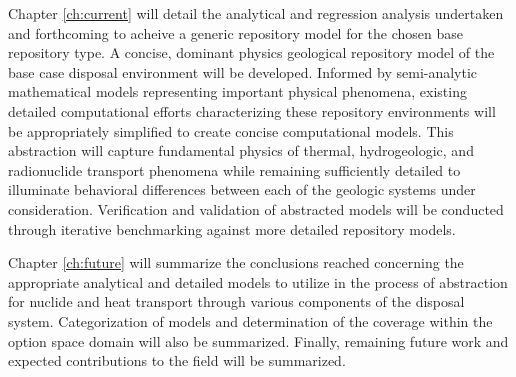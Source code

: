 Chapter \ref{ch:current} will detail the analytical and regression 
analysis undertaken and forthcoming to acheive a generic repository model for the 
chosen base repository type. A concise, dominant physics geological 
repository model of the base case disposal environment will be 
developed. Informed by semi-analytic mathematical models representing 
important physical phenomena, existing detailed computational efforts 
characterizing these repository environments will be appropriately 
simplified to create concise computational models. This abstraction 
will capture fundamental physics of thermal, hydrogeologic, and 
radionuclide transport phenomena while remaining sufficiently detailed 
to illuminate behavioral differences between each of the geologic 
systems under consideration.  Verification and validation of 
abstracted models will be conducted through iterative benchmarking 
against more detailed repository models.

% 

Chapter \ref{ch:future} will summarize the conclusions reached 
concerning the appropriate analytical and detailed models to utilize 
in the process of abstraction for nuclide and heat transport through 
various components of the disposal system. Categorization of models 
and determination of the coverage within the option space domain will 
also be summarized. Finally, remaining future work and expected 
contributions to the field will be summarized. 
